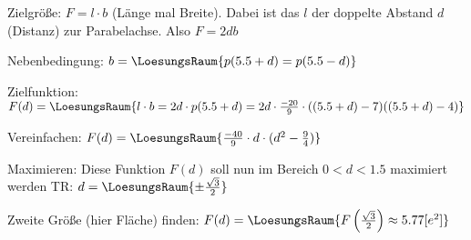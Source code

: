 Zielgröße: $F = l\cdot{}b$ (Länge mal Breite). Dabei ist das $l$ der doppelte Abstand $d$ (Distanz) zur Parabelachse.
Also $F = 2db$

Nebenbedingung: $b = \LoesungsRaum{p(5.5 + d) = p(5.5-d)}$

Zielfunktion: $F(d) = \LoesungsRaum{l\cdot{}b = 2d\cdot{}p(5.5+d) = 2d\cdot{}\frac{-20}9\cdot((5.5+d)-7)((5.5+d)-4)}$

Vereinfachen:
$F(d) = \LoesungsRaum{\frac{-40}9\cdot{}d\cdot{}(d^2-\frac94)}$

Maximieren: Diese Funktion $F(d)$ soll nun im Bereich $0<d<1.5$ maximiert werden TR: $d = \LoesungsRaum{\pm\frac{\sqrt{3}}2}$

Zweite Größe (hier Fläche) finden: $F(d) = \LoesungsRaum{F\left(\frac{\sqrt{3}}2\right) \approx 5.77 [e^2]}$


